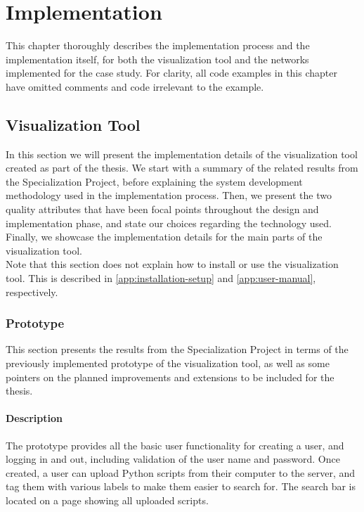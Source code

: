 
\chapter{Implementation}\label{chap:implementation}

This chapter thoroughly describes the implementation process and the implementation itself, for both the visualization tool and the networks implemented for the case study. For clarity, all code examples in this chapter have omitted comments and code irrelevant to the example.

\section{Visualization Tool}

In this section we will present the implementation details of the visualization tool created as part of the thesis. We start with a summary of the related results from the Specialization Project, before explaining the system development methodology used in the implementation process. Then, we present the two quality attributes that have been focal points throughout the design and implementation phase, and state our choices regarding the technology used. Finally, we showcase the implementation details for the main parts of the visualization tool. \\

\noindent Note that this section does not explain how to install or use the visualization tool. This is described in \autoref{app:installation-setup} and \autoref{app:user-manual}, respectively.

\subsection{Prototype}

This section presents the results from the Specialization Project in terms of the previously implemented prototype of the visualization tool, as well as some pointers on the planned improvements and extensions to be included for the thesis.

\subsubsection{Description}

\noindent The prototype provides all the basic user functionality for creating a user, and logging in and out, including validation of the user name and password. Once created, a user can upload Python scripts from their computer to the server, and tag them with various labels to make them easier to search for. The search bar is located on a page showing all uploaded scripts. \\

